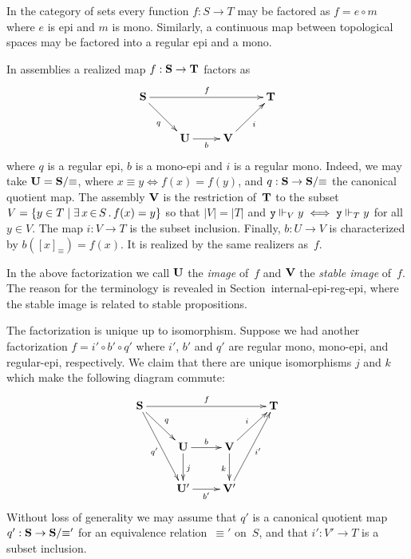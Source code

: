 In the category of sets every function $f : S \to T$ may be factored
as $f = e \circ m$ where $e$ is epi and $m$ is mono. Similarly, a
continuous map between topological spaces may be factored into a
regular epi and a mono.

In assemblies a realized map $f : \mathbf{S} \to \mathbf{T}$ factors as
%
\begin{equation*}
  \xymatrix{
    {\asm{S}}
    \ar[rrr]^{f}
    \ar[rd]_{q}
    &
    &
    &
    {\asm{T}}
    \\
    &
    {\asm{U}}
    \ar[r]_{b}
    &
    {\asm{V}}
    \ar[ru]_{i}
    &
  }
\end{equation*}
%
where $q$ is a regular epi, $b$ is a mono-epi and $i$ is a regular
mono. Indeed, we may take $\mathbf{U} = \mathbf{S}/{\equiv}$, where $x
\equiv y \iff f(x) = f(y)$, and $q : \mathbf{S} \to \mathbf{S}/{\equiv}$ the
canonical quotient map. The assembly $\mathbf{V}$ is the restriction
of~$\mathbf{T}$ to the subset $V = \{y \in T \mid \exists\, x \,{\in}\, S\,.\,f(x) =
    y\}$ so that $|V| = |T|$ and $\mathtt{y} \Vdash_V y \iff \mathtt{y} \Vdash_T y$
for all $y \in V$. The map $i : V \to T$ is the subset inclusion.
Finally, $b : U \to V$ is characterized by $b([x]_{\equiv}) = f(x)$.
It is realized by the same realizers as~$f$.

In the above factorization we call $\mathbf{U}$ the \emph{image} of~$f$
and $\mathbf{V}$ the \emph{stable image} of~$f$. The reason for the
terminology is revealed in Section~{internal-epi-reg-epi}, where the
stable image is related to stable propositions.

The factorization is unique up to isomorphism. Suppose we had another
factorization $f = i' \circ b' \circ q'$ where $i'$, $b'$ and $q'$ are
regular mono, mono-epi, and regular-epi, respectively. We claim that
there are unique isomorphisms $j$ and $k$ which make the following
diagram commute:
%
\begin{equation*}
  \xymatrix{
    {\asm{S}}
    \ar[rrr]^{f}
    \ar[rd]^{q}
    \ar[rdd]_{q'}
    &
    &
    &
    {\asm{T}}
    \\
    &
    {\asm{U}}
    \ar[r]^{b}
    \ar[d]^{j}
    &
    {\asm{V}}
    \ar[ru]^{i}
    \ar[d]_{k}
    &
    \\
    &
    {\asm{U}'}
    \ar[r]_{b'}
    &
    {\asm{V}'}
    \ar[ruu]_{i'}
    &    
  }
\end{equation*}
%
Without loss of generality we may assume that $q'$ is a canonical
quotient map $q' : \mathbf{S} \to \mathbf{S}/{\equiv'}$ for an equivalence
relation~$\equiv'$ on~$S$, and that $i' : V' \to T$ is a subset
inclusion.

